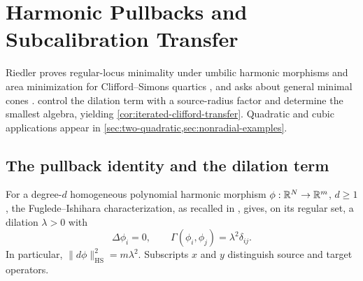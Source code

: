 \section[Harmonic Pullbacks and Transfer]{Harmonic Pullbacks and Subcalibration Transfer}
\label{sec:quartic-application}

Riedler proves regular-locus minimality under umbilic harmonic morphisms
and area minimization for Clifford--Simons quartics
\cite[Theorems~5.1.4 and~5.2.5]{RiedlerThesis25}, and asks about general
minimal cones \cite[Question~5.3.3(2), p.~88]{RiedlerThesis25}.
control the dilation term with a source-radius factor and determine the
smallest algebra, yielding \cref{cor:iterated-clifford-transfer}.
Quadratic and cubic applications appear in
\cref{sec:two-quadratic,sec:nonradial-examples}.

\subsection{The pullback identity and the dilation term}

For a degree-\(d\) homogeneous polynomial harmonic morphism
\(\phi:\mathbb R^N\to\mathbb R^m\), \(d\ge1\), the Fuglede--Ishihara
characterization, as recalled in
\cite[Theorem~2.1.2]{RiedlerThesis25},
gives, on its regular set, a dilation \(\lambda>0\) with
\[
 \Delta\phi_i=0,\qquad
 \Gamma(\phi_i,\phi_j)=\lambda^2\delta_{ij}.
\]
In particular, \(\|d\phi\|_{\mathrm{HS}}^2=m\lambda^2\).
Subscripts \(x\) and \(y\) distinguish source and target operators.

